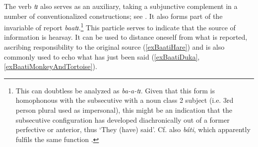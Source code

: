 The verb \textit{tɪ} also serves as an auxiliary, taking a subjunctive complement in a number of conventionalized constructions; see . It also forms part of the invariable  of report \textit{baatɪ}.\footnote{This can doubtless be analyzed as \textit{ba-a-tɪ}. Given that this form is homophonous with the subsecutive with a noun class 2 subject (i.e. 3rd person plural used as impersonal), this might be an indication that the subsecutive configuration has developed diachronically out of a former perfective or anterior, thus \lq They (have) said'. Cf. also  \textit{báti}, which apparently fulfils the same function \citep[107]{BotneR2008}.} This particle serves to indicate that the source of information is hearsay. It can be used to distance oneself from what is reported, ascribing responsibility to the original source (\ref{exBaatiHare}) and is also commonly used to echo what has just been said (\ref{exBaatiDuka}, \ref{exBaatiMonkeyAndTortoise}).

